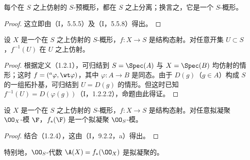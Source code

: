 每个在 $S$ 之上仿射的 $S$-预概形，都在 $S$ 之上分离；换言之，它是一个 $S$-概形。
\begin{proof}
这立即由（I，5.5.5）及（I，5.5.8）得出。
\end{proof}

设 $X$ 是一个在 $S$ 之上仿射的 $S$-概形，$f:X\to S$ 是结构态射。对任意开集 $U\subset S$，$f^{-1}(U)$ 在 $U$ 之上仿射。
\begin{proof}
根据定义（1.2.1），可归结到 $S=\Spec(A)$ 与 $X=\Spec(B)$ 均仿射的情形；这时
$f=({}^{a}\varphi,\wt\varphi)$，其中 $\varphi:A\to B$ 是同态。由于 $D(g)$（$g\in A$）构成 $S$ 的一组拓扑基，可归结到 $U=D(g)$ 的情形。但这时已知
$f^{-1}(U)=D(\varphi(g))$（I，1.2.2.2），命题由此得证。
\end{proof}

设 $X$ 是一个在 $S$ 之上仿射的 $S$-概形，$f:X\to S$ 是结构态射。对任意拟凝聚 $\OO_X$-模 $\F$，$f_*(\F)$ 是一个拟凝聚 $\OO_S$-模。
\begin{proof}
结合（1.2.4），这由（I，9.2.2，a）得出。
\end{proof}
特别地，$\OO_S$-代数 $\A(X)=f_*(\OO_X)$ 是拟凝聚的。

